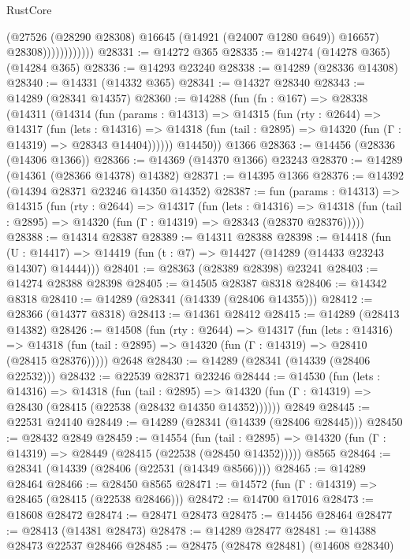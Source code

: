 \begin{lexlean}{RustCore}
\begin{coremodule}
                            (@27526 (@28290 @28308) @16645 (@14921 (@24007 @1280 @649)) @16657)
                            @28308))))))))))))
@28331 := @14272 @365
@28335 := @14274 (@14278 @365) (@14284 @365)
@28336 := @14293 @23240
@28338 := @14289 (@28336 @14308)
@28340 := @14331 (@14332 @365)
@28341 := @14327 @28340
@28343 := @14289 (@28341 @14357)
@28360 := @14288
    (fun (fn : @167) =>
    @28338
      (@14311
        (@14314
          (fun (params : @14313) =>
          @14315
            (fun (rty : @2644) =>
            @14317
              (fun (lets : @14316) =>
              @14318 (fun (tail : @2895) => @14320 (fun (Γ : @14319) => @28343 @14404))))))
        @14450))
    @1366
@28363 := @14456 (@28336 (@14306 @1366))
@28366 := @14369 (@14370 @1366) @23243
@28370 := @14289 (@14361 (@28366 @14378) @14382)
@28371 := @14395 @1366
@28376 := @14392 (@14394 @28371 @23246 @14350 @14352)
@28387 := fun (params : @14313) =>
  @14315
    (fun (rty : @2644) =>
    @14317
      (fun (lets : @14316) =>
      @14318 (fun (tail : @2895) => @14320 (fun (Γ : @14319) => @28343 (@28370 @28376)))))
@28388 := @14314 @28387
@28389 := @14311 @28388
@28398 := @14418
    (fun (U : @14417) => @14419 (fun (t : @7) => @14427 (@14289 (@14433 @23243 @14307) @14444)))
@28401 := @28363 (@28389 @28398) @23241
@28403 := @14274 @28388 @28398
@28405 := @14505 @28387 @8318
@28406 := @14342 @8318
@28410 := @14289 (@28341 (@14339 (@28406 @14355)))
@28412 := @28366 (@14377 @8318)
@28413 := @14361 @28412
@28415 := @14289 (@28413 @14382)
@28426 := @14508
    (fun (rty : @2644) =>
    @14317
      (fun (lets : @14316) =>
      @14318 (fun (tail : @2895) => @14320 (fun (Γ : @14319) => @28410 (@28415 @28376)))))
    @2648
@28430 := @14289 (@28341 (@14339 (@28406 @22532)))
@28432 := @22539 @28371 @23246
@28444 := @14530
    (fun (lets : @14316) =>
    @14318
      (fun (tail : @2895) =>
      @14320 (fun (Γ : @14319) => @28430 (@28415 (@22538 (@28432 @14350 @14352))))))
    @2849
@28445 := @22531 @24140
@28449 := @14289 (@28341 (@14339 (@28406 @28445)))
@28450 := @28432 @2849
@28459 := @14554
    (fun (tail : @2895) => @14320 (fun (Γ : @14319) => @28449 (@28415 (@22538 (@28450 @14352)))))
    @8565
@28464 := @28341 (@14339 (@28406 (@22531 (@14349 @8566))))
@28465 := @14289 @28464
@28466 := @28450 @8565
@28471 := @14572 (fun (Γ : @14319) => @28465 (@28415 (@22538 @28466)))
@28472 := @14700 @17016
@28473 := @18608 @28472
@28474 := @28471 @28473
@28475 := @14456 @28464
@28477 := @28413 (@14381 @28473)
@28478 := @14289 @28477
@28481 := @14388 @28473 @22537 @28466
@28485 := @28475 (@28478 @28481) (@14608 @28340)

\end{coremodule}
\end{lexlean}
